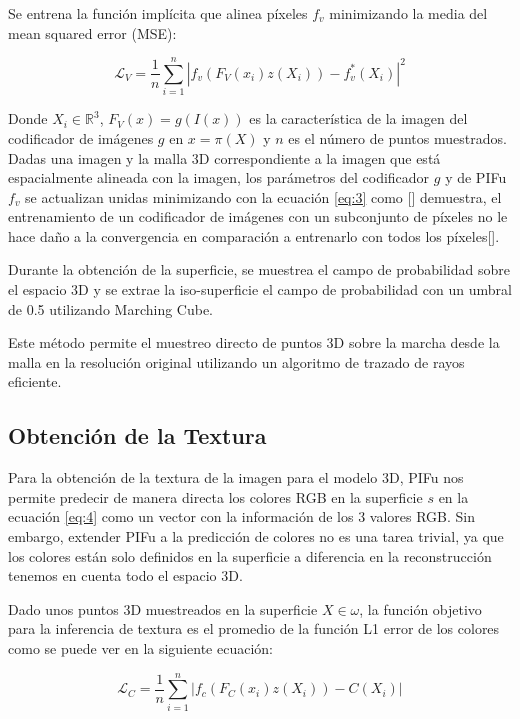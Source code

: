 Se entrena la función implícita que alinea píxeles $f_{v}$ minimizando la media del mean squared error (MSE):

\begin{equation}
	\label{eq:3}
	\mathcal{L}_{V} = \frac{1}{n} 
	\sum_{i=1}^{n} | f_{v} (F_{V}(x_{i}) z(X_{i})) - f_{v}^{*}(X_{i}) |^{2}
\end{equation}
 
Donde $X_{i} \in \mathbb{R}^{3}$, $F_{V}(x) = g(I(x))$ es la característica de la imagen del codificador de imágenes $g$ en $x = \pi(X)$ y $n$ es el número de puntos muestrados. Dadas una imagen y la malla 3D correspondiente a la imagen que está espacialmente alineada con la imagen, los parámetros del codificador $g$ y de PIFu $f_{v}$ se actualizan unidas minimizando con la ecuación \ref{eq:3} como [\cite{eq3}] demuestra, el entrenamiento de un codificador de imágenes con un subconjunto de píxeles no le hace daño a la convergencia en comparación a entrenarlo con todos los píxeles[\cite{pifu}]. 

Durante la obtención de la superficie, se muestrea el campo de probabilidad sobre el espacio 3D y se extrae la iso-superficie el campo de probabilidad con un umbral de 0.5 utilizando Marching Cube. 

Este método permite el muestreo directo de puntos 3D sobre la marcha desde la malla en la resolución original utilizando un algoritmo de trazado de rayos eficiente.

\subsection{Obtención de la Textura}
Para la obtención de la textura de la imagen para el modelo 3D, PIFu nos permite predecir de manera directa los colores RGB en la superficie $s$ en la ecuación \ref{eq:4} como un vector con la información de los 3 valores RGB. Sin embargo, extender PIFu a la predicción de colores no es una tarea trivial, ya que los colores están solo definidos en la superficie a diferencia en la reconstrucción tenemos en cuenta todo el espacio 3D. 

Dado unos puntos 3D muestreados en la superficie $X \in \omega$, la función objetivo para la inferencia de textura es el promedio de la función L1 error de los colores como se puede ver en la siguiente ecuación:

\begin{equation}
	\label{eq:4}
	\mathcal{L}_{C} = \frac{1}{n} 
	\sum_{i=1}^{n} | f_{c} (F_{C}(x_{i}) z(X_{i})) - C(X_{i}) |
\end{equation}

